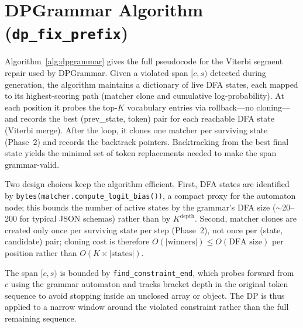 \appendix

\section{DPGrammar Algorithm (\texttt{dp\_fix\_prefix})}
\label{app:alg}

Algorithm~\ref{alg:dpgrammar} gives the full pseudocode for the Viterbi segment repair used by DPGrammar.
Given a violated span $[c,s)$ detected during generation, the algorithm maintains a dictionary of live DFA states, each mapped to its highest-scoring path (matcher clone and cumulative log-probability).
At each position it probes the top-$K$ vocabulary entries via rollback—no cloning—and records the best (prev\_state, token) pair for each reachable DFA state (Viterbi merge).
After the loop, it clones one matcher per surviving state (Phase~2) and records the backtrack pointers.
Backtracking from the best final state yields the minimal set of token replacements needed to make the span grammar-valid.

Two design choices keep the algorithm efficient.
First, DFA states are identified by \texttt{bytes(matcher.compute\_logit\_bias())}, a compact proxy for the automaton node; this bounds the number of active states by the grammar's DFA size ($\sim$20--200 for typical JSON schemas) rather than by $K^{\text{depth}}$.
Second, matcher clones are created only once per surviving state per step (Phase~2), not once per (state, candidate) pair; cloning cost is therefore $O(|\text{winners}|) \leq O(\text{DFA size})$ per position rather than $O(K \times |\text{states}|)$.

The span $[c,s)$ is bounded by \texttt{find\_constraint\_end}, which probes forward from $c$ using the grammar automaton and tracks bracket depth in the original token sequence to avoid stopping inside an unclosed array or object.
The DP is thus applied to a narrow window around the violated constraint rather than the full remaining sequence.

